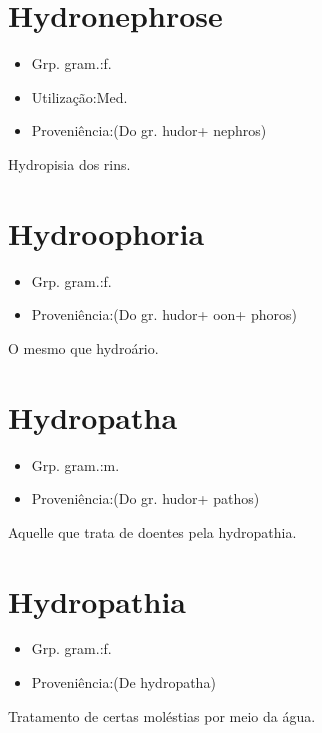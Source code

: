 \documentclass{article}
\begin{document}
\section{Hydronephrose}
\begin{itemize}
\item {Grp. gram.:f.}
\end{itemize}
\begin{itemize}
\item {Utilização:Med.}
\end{itemize}
\begin{itemize}
\item {Proveniência:(Do gr. \textunderscore hudor\textunderscore  + \textunderscore nephros\textunderscore )}
\end{itemize}
Hydropisia dos rins.
\section{Hydroophoria}
\begin{itemize}
\item {Grp. gram.:f.}
\end{itemize}
\begin{itemize}
\item {Proveniência:(Do gr. \textunderscore hudor\textunderscore  + \textunderscore oon\textunderscore  + \textunderscore phoros\textunderscore )}
\end{itemize}
O mesmo que \textunderscore hydroário\textunderscore .
\section{Hydropatha}
\begin{itemize}
\item {Grp. gram.:m.}
\end{itemize}
\begin{itemize}
\item {Proveniência:(Do gr. \textunderscore hudor\textunderscore  + \textunderscore pathos\textunderscore )}
\end{itemize}
Aquelle que trata de doentes pela hydropathia.
\section{Hydropathia}
\begin{itemize}
\item {Grp. gram.:f.}
\end{itemize}
\begin{itemize}
\item {Proveniência:(De \textunderscore hydropatha\textunderscore )}
\end{itemize}
Tratamento de certas moléstias por meio da água.
\end{document}
